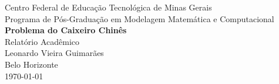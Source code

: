 \begin{titlepage}
    \centering
    {\large Centro Federal de Educação Tecnológica de Minas Gerais\\}
    {\large Programa de Pós-Graduação em Modelagem Matemática e Computacional\\}
    \vspace{3cm}
    {\LARGE\bfseries Problema do Caixeiro Chinês\\}
    \vspace{2cm}
    {\large Relatório Acadêmico\\}
    \vspace{2cm}
    {\large Leonardo Vieira Guimarães\\}
    {\large Belo Horizonte\\}
    {\large \today}
\end{titlepage}
